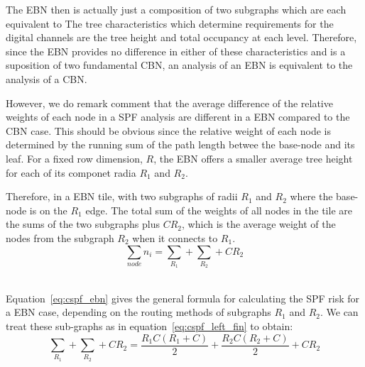 


The EBN then is actually just a composition of two subgraphs which are each equivalent to The tree characteristics which determine requirements for the digital channels are the tree height and total occupancy at each level.
Therefore, since the EBN provides no difference in either of these characteristics and is a suposition of two fundamental CBN, an analysis of an EBN is equivalent to the analysis of a CBN.

However, we do remark comment that the average difference of the relative weights of each node in a SPF analysis are different in a EBN compared to the CBN case.
This should be obvious since the relative weight of each node is determined by the running sum of the path length betwee the base-node and its leaf.
For a fixed row dimension, $R$, the EBN offers a smaller average tree height for each of its componet radia $R_{1}$ and $R_{2}$.

Therefore, in a EBN tile, with two subgraphs of radii $R_{1}$ and $R_{2}$ where the base-node is on the $R_{1}$ edge.
The total sum of the weights of all nodes in the tile are the sums of the two subgraphs plus $CR_{2}$, which is the average weight of the nodes from the subgraph $R_{2}$ when it connects to $R_{1}$.
\begin{equation}
  \sum_{node}n_{i} = \sum_{R_{1}} + \sum_{R_{2}} + CR_{2}
\end{equation}~\label{eq:cspf_ebn}

Equation~\ref{eq:cspf_ebn} gives the general formula for calculating the SPF risk for a EBN case, depending on the routing methods of subgraphs $R_{1}$ and $R_{2}$.
We can treat these sub-graphs as in equation~\ref{eq:cspf_left_fin} to obtain:
\begin{equation}
  \sum_{R_{1}} + \sum_{R_{2}} + CR_{2} = \frac{R_{1}C(R_{1}+C)}{2} + \frac{R_{2}C(R_{2}+C)}{2} + CR_{2}
\end{equation}~\label{eq:cspf_e}

